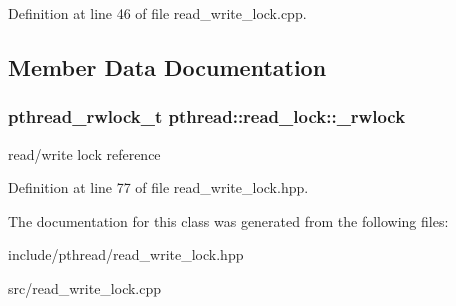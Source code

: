 Definition at line 46 of file read\+\_\+write\+\_\+lock.\+cpp.



\subsection{Member Data Documentation}
\hypertarget{classpthread_1_1read__lock_af63582bfd9518cf6e5a081fd39b25f68}{
\subsubsection[{\+\_\+rwlock}]{\setlength{\rightskip}{0pt plus 5cm}pthread\+\_\+rwlock\+\_\+t pthread\+::read\+\_\+lock\+::\+\_\+rwlock\hspace{0.3cm}{\ttfamily [protected]}}}\label{classpthread_1_1read__lock_af63582bfd9518cf6e5a081fd39b25f68}
read/write lock reference 

Definition at line 77 of file read\+\_\+write\+\_\+lock.\+hpp.



The documentation for this class was generated from the following files\+:\begin{DoxyCompactItemize}
\item 
include/pthread/read\+\_\+write\+\_\+lock.\+hpp\item 
src/read\+\_\+write\+\_\+lock.\+cpp\end{DoxyCompactItemize}
